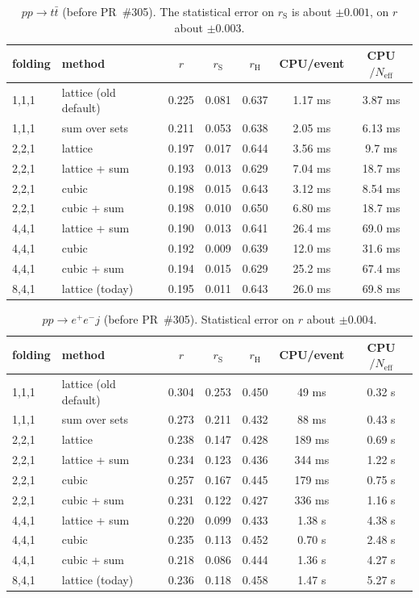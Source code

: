 \documentclass[11pt,a4paper]{article}
\newcommand{\rS}{r_{\mathrm S}}
\newcommand{\rH}{r_{\mathrm H}}
\newcommand{\Neff}{N_{\mathrm{eff}}}
\begin{document}
\begin{table}[p]
\centering\small
\begin{tabular}{llccccc}
\toprule
folding & method & $r$ & $\rS$ & $\rH$ & CPU/event & CPU$/\Neff$\\
\midrule
1,1,1 & lattice (old default) & 0.225 & 0.081 & 0.637 & 1.17 ms & 3.87 ms\\
1,1,1 & sum over sets & 0.211 & 0.053 & 0.638 & 2.05 ms & 6.13 ms\\
2,2,1 & lattice & 0.197 & 0.017 & 0.644 & 3.56 ms & 9.7 ms\\
2,2,1 & lattice + sum & 0.193 & 0.013 & 0.629 & 7.04 ms & 18.7 ms\\
2,2,1 & cubic & 0.198 & 0.015 & 0.643 & 3.12 ms & 8.54 ms\\
2,2,1 & cubic + sum & 0.198 & 0.010 & 0.650 & 6.80 ms & 18.7 ms\\
4,4,1 & lattice + sum & 0.190 & 0.013 & 0.641 & 26.4 ms & 69.0 ms\\
4,4,1 & cubic & 0.192 & 0.009 & 0.639 & 12.0 ms & 31.6 ms\\
4,4,1 & cubic + sum & 0.194 & 0.015 & 0.629 & 25.2 ms & 67.4 ms\\
8,4,1 & lattice (today) & 0.195 & 0.011 & 0.643 & 26.0 ms & 69.8 ms\\
\bottomrule
\end{tabular}
\caption{$pp\to t\bar t$ (before PR~\#305). The statistical error on $\rS$ is about $\pm0.001$, on $r$ about $\pm0.003$.}
\label{tab:tt}
\end{table}

\begin{table}[p]
\centering\small
\begin{tabular}{llccccc}
\toprule
folding & method & $r$ & $\rS$ & $\rH$ & CPU/event & CPU$/\Neff$\\
\midrule
1,1,1 & lattice (old default) & 0.304 & 0.253 & 0.450 & 49 ms & 0.32 s\\
1,1,1 & sum over sets & 0.273 & 0.211 & 0.432 & 88 ms & 0.43 s\\
2,2,1 & lattice & 0.238 & 0.147 & 0.428 & 189 ms & 0.69 s\\
2,2,1 & lattice + sum & 0.234 & 0.123 & 0.436 & 344 ms & 1.22 s\\
2,2,1 & cubic & 0.257 & 0.167 & 0.445 & 179 ms & 0.75 s\\
2,2,1 & cubic + sum & 0.231 & 0.122 & 0.427 & 336 ms & 1.16 s\\
4,4,1 & lattice + sum & 0.220 & 0.099 & 0.433 & 1.38 s & 4.38 s\\
4,4,1 & cubic & 0.235 & 0.113 & 0.452 & 0.70 s & 2.48 s\\
4,4,1 & cubic + sum & 0.218 & 0.086 & 0.444 & 1.36 s & 4.27 s\\
8,4,1 & lattice (today) & 0.236 & 0.118 & 0.458 & 1.47 s & 5.27 s\\
\bottomrule
\end{tabular}
\caption{$pp\to e^+e^-j$ (before PR~\#305). Statistical error on $r$ about $\pm0.004$.}
\label{tab:eej}
\end{table}
\end{document}
